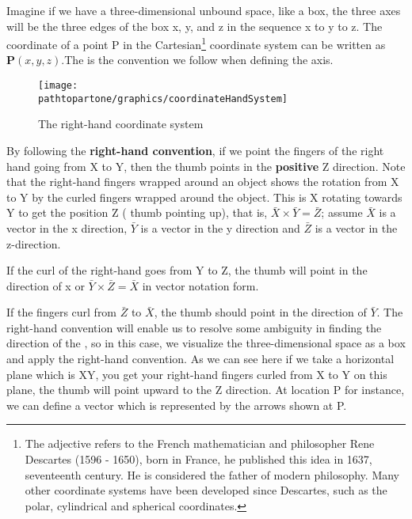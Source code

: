 Imagine if we have a three-dimensional unbound space, like a box, the three axes will be the three edges of the box x, y, and z in the sequence x to y to z. The coordinate of a point P in the {Cartesian}\footnote{The adjective \textacutedbl refers to the French mathematician and philosopher Rene Descartes (1596 - 1650), born in France, he published this idea in 1637, seventeenth century. He is considered the father of modern philosophy. Many other coordinate systems have been developed since Descartes, such as the polar, cylindrical and spherical coordinates.} coordinate system can be written as $\boldsymbol{P}(x, y, z)$.The  is the convention we follow when defining the axis.
\begin{figure}[h]
\centering
\texttt{[image: \\pathtopartone/graphics/coordinateHandSystem]}
\caption{The right-hand coordinate system}
\end{figure}

By following the \textbf{right-hand convention}, if we point the fingers of the right hand going from X to Y, then the thumb points in the \textbf{positive} Z direction. Note that the right-hand fingers wrapped around an object shows the rotation from X to Y by the curled fingers wrapped around the object. This is X rotating towards Y to get the position Z ( thumb pointing up), that is, $\bar{X} \times \bar{Y} = \bar{Z}$; assume  $\bar{X}$ is a vector in the x direction, $\bar{Y}$ is a vector in the y direction and $\bar{Z}$ is a vector in the z-direction.

If the curl of the right-hand goes from Y to Z, the thumb will point in the direction of x or $\bar{Y} \times \bar{Z} = \bar{X}$ in vector notation form.

If the fingers curl from $\bar{Z}$ to $\bar{X}$, the thumb should point in the direction of $\bar{Y}$. The right-hand convention will enable us to resolve some ambiguity in finding the direction of the , so in this case, we visualize the three-dimensional space as a box and apply the right-hand convention. As we can see here if we take a horizontal plane which is XY, you get your right-hand fingers curled from X to Y on this plane, the thumb will point upward to the Z direction. At location P for instance, we can define a vector which is represented by the arrows shown at P.

